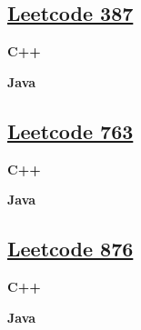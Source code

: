 \subsection{\href{https://leetcode-cn.com/}{Leetcode 387}}\label{app:codelist:leetcode:387}

\textbf{C++}\par


\textbf{Java}\par



\subsection{\href{https://leetcode-cn.com/}{Leetcode 763}}\label{app:codelist:leetcode:763}

\textbf{C++}\par


\textbf{Java}\par



\subsection{\href{https://leetcode-cn.com/}{Leetcode 876}}\label{app:codelist:leetcode:876}

\textbf{C++}\par


\textbf{Java}\par



